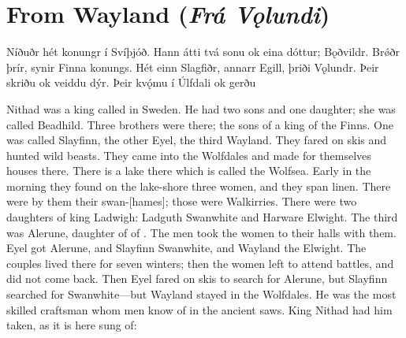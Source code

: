\sectionline

\section{From Wayland (\emph{Frá Vǫlundi})}

\bpg\bpa{}Níðuðr hét konungr í Svíþjóð.
Hann átti tvá sonu ok eina dóttur;  Bǫðvildr.
Brǿðr  þrír, synir Finna konungs. Hét einn Slagfiðr, annarr Egill, þriði Vǫlundr.
Þeir skriðu ok veiddu dýr. Þeir kvǫ́mu í Úlfdali ok gerðu \epa

\bpb Nithad was a king called in Sweden.
He had two sons and one daughter; she was called Beadhild.
Three brothers were there; the sons of a king of the Finns. One was called Slayfinn, the other Eyel, the third Wayland.
They fared on skis and hunted wild beasts. They came into the Wolfdales and made for themselves houses there.
There is a lake there which is called the Wolfsea.
Early in the morning they found on the lake-shore three women, and they span linen. There were by them their swan-[hames]; those were Walkirries.
There were two daughters of king Ladwigh: Ladguth Swanwhite and Harware Elwight. The third was Alerune, daughter of  of .
The men took the women to their halls with them.  Eyel got Alerune, and Slayfinn Swanwhite, and Wayland the Elwight.
The couples lived there for seven winters; then the women left to attend battles, and did not come back.
Then Eyel fared on skis to search for Alerune, but Slayfinn searched for Swanwhite—but Wayland stayed in the Wolfdales.
He was the most skilled craftsman whom men know of in the ancient saws. King Nithad had him taken, as it is here sung of:\epb\epg

